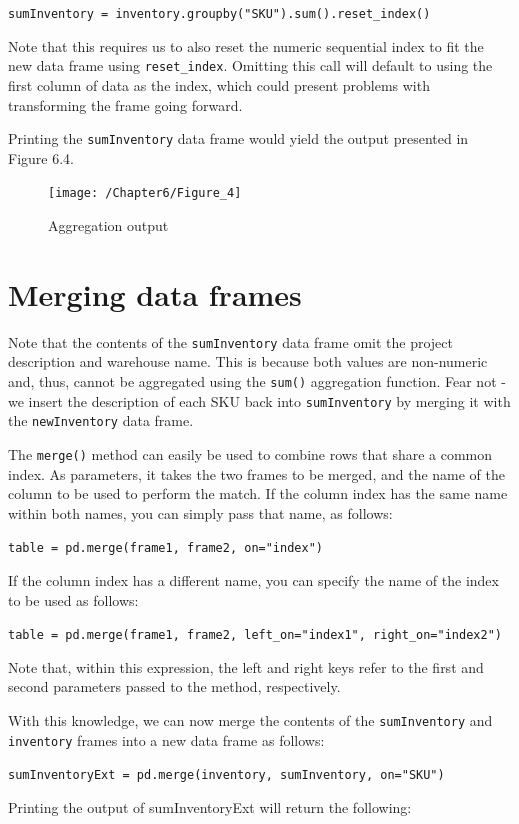 \documentclass{book}
\begin{document}
\texttt{sumInventory = inventory.groupby("SKU").sum().reset\_index()}

Note that this requires us to also reset the numeric sequential index to fit the new data frame using \texttt{reset\_index}. Omitting this call will default to using the first column of data as the index, which could present problems with transforming the frame going forward.

Printing the \texttt{sumInventory} data frame would yield the output presented in Figure 6.4.

\begin{figure}[h]
	\caption{Aggregation output}
	\centering\texttt{[image: /Chapter6/Figure\_4]}
\end{figure}

\section{Merging data frames}
Note that the contents of the \texttt{sumInventory} data frame omit the project description and warehouse name. This is because both values are non-numeric and, thus, cannot be aggregated using the \texttt{sum()} aggregation function. Fear not - we insert the description of each SKU back into \texttt{sumInventory} by merging it with the \texttt{newInventory} data frame.

The \texttt{merge()} method can easily be used to combine rows that share a common index. As parameters, it takes the two frames to be merged, and the name of the column to be used to perform the match. If the column index has the same name within both names, you can simply pass that name, as follows:

\texttt{table = pd.merge(frame1, frame2, on="index")}

If the column index has a different name, you can specify the name of the index to be used as follows:

\texttt{table = pd.merge(frame1, frame2, left\_on="index1", right\_on="index2")}

Note that, within this expression, the left and right keys refer to the first and second parameters passed to the method, respectively.

With this knowledge, we can now merge the contents of the \texttt{sumInventory} and \texttt{inventory} frames into a new data frame as follows:

\texttt{sumInventoryExt = pd.merge(inventory, sumInventory, on="SKU")}

Printing the output of sumInventoryExt will return the following:
\end{document}
